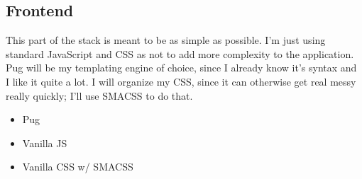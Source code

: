 \subsection{Frontend}
This part of the stack is meant to be as simple as possible. I'm just using standard JavaScript and CSS
as not to add more complexity to the application. Pug will be my templating engine of choice, since I already
know it's syntax and I like it quite a lot. I will organize my CSS, since it can otherwise get real messy really quickly; I'll use SMACSS to do that.

\begin{itemize}
  \item Pug
  \item Vanilla JS
  \item Vanilla CSS w/ SMACSS
\end{itemize}
